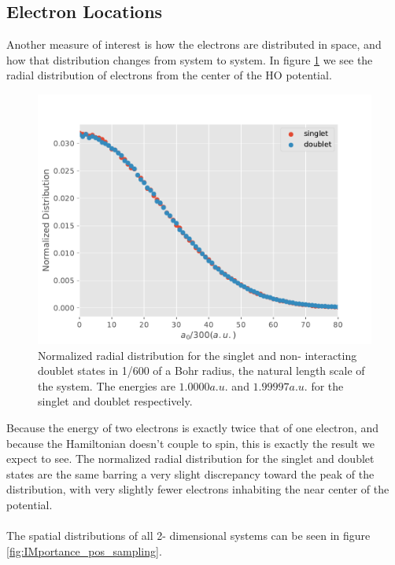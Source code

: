 \documentclass[11pt,a4paper,titlepage]{article}
\begin{document}
\subsection{Electron Locations}
Another measure of interest is how the electrons are distributed in space, and how that distribution changes from system to system. In figure \ref{fig:radial_oneAndTwo} we see the radial distribution of electrons from the center of the HO potential.
\begin{figure}[H]
\center
\includegraphics[trim=0cm 0.3cm 0cm 0.0cm,scale = 0.6]{Radial_distribution_One_v_Two.pdf}
\caption[Normalized radial distribution of singlet and non- interacting doublet]{Normalized radial distribution for the singlet and non- interacting doublet states in 1/600 of a Bohr radius, the natural length scale of the system. The energies are $1.0000 a.u.$ and $1.99997 a.u.$ for the singlet and doublet respectively. }
\label{fig:radial_oneAndTwo}
\end{figure}
Because the energy of two electrons is exactly twice that of one electron, and because the Hamiltonian doesn't couple to spin, this is exactly the result we expect to see. The normalized radial distribution for the singlet and doublet states are the same barring a very slight discrepancy toward the peak of the distribution, with very slightly fewer electrons inhabiting the near center of the potential.\\\\The spatial distributions of all 2- dimensional systems can be seen in figure \ref{fig:IMportance_pos_sampling}.
\end{document}
